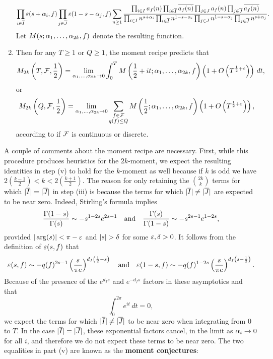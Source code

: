 \begin{enumerate}[label*=(\roman*)]
    \[
      \prod_{i \in \overline{I}}\varepsilon(s+\alpha_{i},f)\prod_{j \in \overline{J}}\varepsilon(1-s-\alpha_{j},f)\sum_{n \ge 1}\frac{\prod_{i \in I}a_{f}(n)\prod_{i \in \overline{I}}\overline{a_{f}(n)}\prod_{j \in J}a_{f}(n)\prod_{j \in \overline{J}}\overline{a_{f}(n)}}{\prod_{i \in I}n^{s+\alpha_{i}}\prod_{i \in \overline{I}}n^{1-s-\alpha_{i}}\prod_{j \in J}n^{1-s-\alpha_{j}}\prod_{j \in \overline{J}}n^{s+\alpha_{j}}}.
    \]
    Let $M(s;\alpha_{1},\ldots,\alpha_{2k},f)$ denote the resulting function.
    \item Then for any $T \ge 1$ or $Q \ge 1$, the moment recipe predicts that
    \[
      M_{2k}\left(T,\mathcal{F},\frac{1}{2}\right) = \lim_{\alpha_{1},\ldots,\alpha_{2k} \to 0}\int_{0}^{T}M\left(\frac{1}{2}+it;\alpha_{1},\ldots,\alpha_{2k},f\right)\left(1+O\left(T^{\frac{1}{2}+\varepsilon}\right)\right)\,dt,
    \]
    or
    \[
       M_{2k}\left(Q,\mathcal{F},\frac{1}{2}\right) = \lim_{\alpha_{1},\ldots,\alpha_{2k} \to 0}\sum_{\substack{f \in \mathcal{F} \\ q(f) \le Q}}M\left(\frac{1}{2};\alpha_{1},\ldots,\alpha_{2k},f\right)\left(1+O\left(T^{\frac{1}{2}+\varepsilon}\right)\right),
    \]
    according to if $\mathcal{F}$ is continuous or discrete.
  \end{enumerate}

  A couple of comments about the moment recipe are necessary. First, while this procedure produces heuristics for the $2k$-moment, we expect the resulting identities in step (v) to hold for the $k$-moment as well because if $k$ is odd we have $2\left(\frac{k-1}{2}\right) < k < 2\left(\frac{k+1}{2}\right)$. The reason for only retaining the $\binom{2k}{k}$ terms for which $|\overline{I}| = |\overline{J}|$ in step (iii) is because the terms for which $|\overline{I}| \neq |\overline{J}|$ are expected to be near zero. Indeed, Stirling's formula implies
  \[
    \frac{\Gamma(1-s)}{\Gamma(s)} \sim -s^{1-2s}e^{2s-1} \quad \text{and} \quad \frac{\Gamma(s)}{\Gamma(1-s)} \sim -s^{2s-1}e^{1-2s},
  \]
  provided $|\arg(s)| < \pi-\varepsilon$ and $|s| > \delta$ for some $\varepsilon,\delta > 0$. It follows from the definition of $\varepsilon(s,f)$ that
  \[
    \varepsilon(s,f) \sim -q(f)^{2s-1}\left(\frac{s}{\pi e}\right)^{d_{f}\left(\frac{1}{2}-s\right)} \quad \text{and} \quad \varepsilon(1-s,f) \sim -q(f)^{1-2s}\left(\frac{s}{\pi e}\right)^{d_{f}\left(s-\frac{1}{2}\right)}.
  \]
  Because of the presence of the $e^{d_{f}s}$ and $e^{-d_{f}s}$ factors in these asymptotics and that
  \[
    \int_{0}^{2\pi}e^{it}\,dt = 0,
  \]
  we expect the terms for which $|\overline{I}| \neq |\overline{J}|$ to be near zero when integrating from $0$ to $T$. In the case $|\overline{I}| = |\overline{J}|$, these exponential factors cancel, in the limit as $\alpha_{i} \to 0$ for all $i$, and therefore we do not expect these terms to be near zero. The two equalities in part (v) are known as the \textbf{moment conjectures}:

